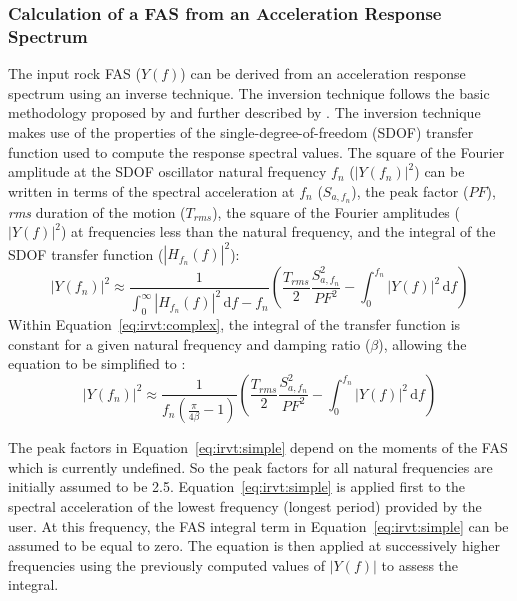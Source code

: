 \documentclass[11pt]{report}
\newcommand{\ud}{\,\mathrm{d}}
\begin{document}

\subsubsection{Calculation of a FAS from an Acceleration Response
Spectrum}\label{ch:siteResponse:methods:rvt:inversion}

The input rock FAS ($Y(f)$) can be derived from an acceleration response spectrum using an inverse
technique.  The inversion technique follows the basic methodology proposed by \citet{gasparini:76} and further
described by \citet{rathje:05}.  The inversion technique makes use of the properties of the
single-degree-of-freedom (SDOF) transfer function used to compute the response spectral values.
The square of the Fourier amplitude at the SDOF oscillator natural frequency
$f_n$ ($|Y(f_n)|^2$) can be written in terms of the spectral acceleration at $f_n$ ($S_{a,f_n}$),
the peak factor ($PF$), \emph{rms} duration of the motion ($T_{rms}$), the square of the Fourier
amplitudes ($|Y(f)|^2$) at frequencies less than the natural frequency, and the integral of the SDOF
transfer function ($|H_{f_n}(f)|^2$):
\begin{equation}
  |Y(f_n)|^2 \approx  \frac{1}{\int_{0}^{\infty} |H_{f_n}(f)|^2 \ud f - f_n} \left(
  \frac{T_{rms}}{2}\frac{S_{a,f_n}^2}{PF^2} - \int_{0}^{f_n} |Y(f)|^2 \ud f
  \right)
  \label{eq:irvt:complex}
\end{equation}
Within Equation~\ref{eq:irvt:complex}, the integral of the transfer function is constant for a given
natural frequency and damping ratio ($\beta$), allowing the equation to be simplified to \citep{gasparini:76}:
\begin{equation}
  |Y(f_n)|^2 \approx  \frac{1}{f_n \left( \frac{\pi}{4\beta} - 1 \right)} \left(
  \frac{T_{rms}}{2}\frac{S_{a,f_n}^2}{PF^2} - \int_{0}^{f_n} |Y(f)|^2 \ud f
  \right)
  \label{eq:irvt:simple}
\end{equation}

The peak factors in Equation~\ref{eq:irvt:simple} depend on the moments of the FAS which is
currently undefined.  So the peak factors for all natural frequencies are initially assumed to be 2.5.
Equation~\ref{eq:irvt:simple} is applied first to the spectral acceleration of the lowest frequency
(longest period) provided by the user. At this frequency, the FAS integral term in Equation~\ref{eq:irvt:simple}
can be assumed to be equal to zero.  The equation is then applied at successively higher frequencies
using the previously computed values of $|Y(f)|$ to assess the integral.
\end{document}
